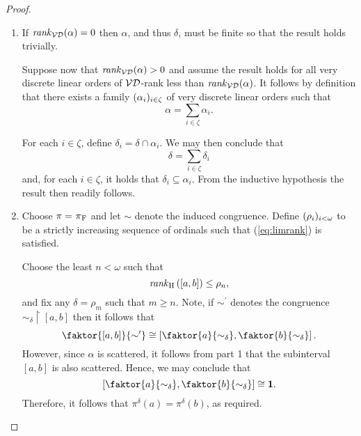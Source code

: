 \begin{proof}\leavevmode
	\begin{enumerate}[topsep=0pt]
		\item If $\mathit{rank}_\mathcal{VD}(\alpha)=0$ then $\alpha$, and thus $\delta$, must be
			finite so that the result holds trivially.

			Suppose now that $\mathit{rank}_\mathcal{VD}(\alpha)>0$ and assume the result holds for
			all very discrete linear orders of $\mathcal{VD}$-rank less than
			$\mathit{rank}_\mathcal{VD}(\alpha)$.  It follows by definition that there exists
			a family $(\alpha_i)_{i\in\zeta}$ of very discrete linear
			orders such that
			\begin{equation}
				\alpha=\sum_{i\in\zeta}\alpha_i.
			\end{equation}

			For each $i\in\zeta$, define $\delta_i=\delta\cap\alpha_i$.  We may
			then conclude that
			\begin{equation}
				\delta=\sum_{i\in\zeta}\delta_i
			\end{equation}
			and, for each $i\in\zeta$, it holds that
			$\delta_i\subseteq\alpha_i$.  From the inductive hypothesis the
			result then readily follows.
			\smallskip

		\item Choose $\pi=\prescript{}{}{\pi}_\mathrm{F}$ and let $\sim$ denote the induced congruence.
			Define $(\rho_i)_{i<\omega}$ to be a strictly increasing
			sequence of ordinals such that (\ref{eq:limrank}) is
			satisfied.

			Choose the least $n<\omega$ such that
			\begin{equation}
				\mathit{rank}_\mathrm{H}\left([a,b]\right)\leq\rho_n,
			\end{equation}
			and fix any $\delta=\rho_m$ such that $m\geq n$.  Note, if
			$\sim^\prime$ denotes the congruence
			$\sim_\delta\restriction[a,b]$ then it follows that
			\begin{equation}
				\faktor{[a,b]}{\sim^\prime}\cong
				\left[\faktor{a}{\sim_\delta}
				\mathpunct{,}\faktor{b}{\sim_\delta}\right].
			\end{equation}
			However, since $\alpha$ is scattered, it follows from part 1 that
			the subinterval $[a,b]$ is also scattered.  Hence, we may conclude
			that
			\begin{equation}
				\left[\faktor{a}{\sim_\delta},\faktor{b}{\sim_\delta}\right]
				\cong\one.
			\end{equation}
			Therefore, it follows that $\pi^\delta(a)=\pi^\delta(b)$, as
			required.
	\end{enumerate}
\end{proof}


